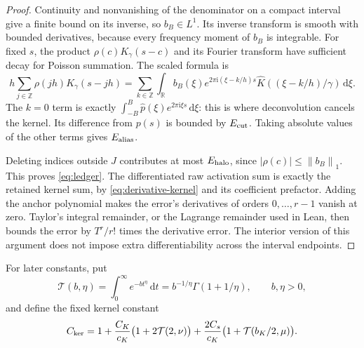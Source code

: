\documentclass[11pt,letterpaper]{article}
\newcommand{\R}{\mathbb R}
\newcommand{\Z}{\mathbb Z}
\newcommand{\dd}{\,\mathrm d}
\newcommand{\ii}{\mathrm i}
\newcommand{\norm}[1]{\left\lVert#1\right\rVert}
\theoremstyle{definition}
\theoremstyle{remark}
\begin{document}
\begin{proof}
Continuity and nonvanishing of the denominator on a compact interval give a
finite bound on its inverse, so \(b_B\in L^1\).
Its inverse transform is smooth with bounded derivatives, because every
frequency moment of \(b_B\) is integrable. For fixed \(s\), the product
\(\rho(c)K_\gamma(s-c)\) and its Fourier transform have sufficient decay for
Poisson summation. The scaled formula is
\[
 h\sum_{j\in\Z}\rho(jh)K_\gamma(s-jh)
 =\sum_{k\in\Z}\int_\R b_B(\xi)
       e^{2\pi\ii(\xi-k/h)s}\widehat K((\xi-k/h)/\gamma)\dd\xi.
\]
The \(k=0\) term is exactly
\(\int_{-B}^{B}\widehat p(\xi)e^{2\pi\ii\xi s}\dd\xi\): this is where
deconvolution cancels the kernel. Its difference from \(p(s)\) is bounded by
\(E_{\rm cut}\). Taking absolute values of the other terms gives \(E_{\rm alias}\).

Deleting indices outside \(J\) contributes at most \(E_{\rm halo}\), since
\(|\rho(c)|\le\norm{b_B}_1\). This proves \eqref{eq:ledger}.
The differentiated raw activation sum is exactly the retained kernel sum,
by \eqref{eq:derivative-kernel} and its coefficient prefactor.
Adding the anchor polynomial makes the error's derivatives of orders
\(0,\ldots,r-1\) vanish at zero. Taylor's integral remainder, or the
Lagrange remainder used in Lean, then bounds the error by
\(T^r/r!\) times the derivative error. The interior version of this argument
does not impose extra differentiability across the interval endpoints.
\end{proof}

For later constants, put
\[
 \mathcal T(b,\eta)=\int_0^\infty e^{-bt^\eta}\dd t
     =b^{-1/\eta}\Gamma(1+1/\eta),\qquad b,\eta>0,
\]
and define the fixed kernel constant
\begin{equation}\label{eq:Cker}
 C_{\rm ker}=1+\frac{C_K}{c_K}\bigl(1+2\mathcal T(2,\nu)\bigr)
       +\frac{2C_s}{c_K}\bigl(1+\mathcal T(b_K/2,\mu)\bigr).
\end{equation}
\end{document}

